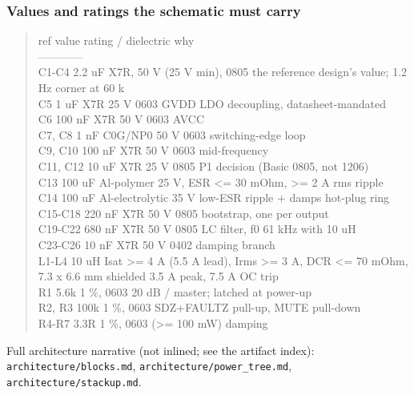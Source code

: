 \documentclass[11pt,a4paper]{article}
\begin{document}
\subsubsection*{Values and ratings the schematic must carry}
\begin{quote}\small\ttfamily\raggedright
\textbar{} ref \textbar{} value \textbar{} rating / dielectric \textbar{} why \textbar{}\\
\textbar{}---\textbar{}---\textbar{}---\textbar{}---\textbar{}\\
\textbar{} C1-C4 \textbar{} 2.2 uF \textbar{} X7R, 50 V (25 V min), 0805 \textbar{} the reference design's value; 1.2 Hz corner at 60 k \textbar{}\\
\textbar{} C5 \textbar{} 1 uF \textbar{} X7R 25 V 0603 \textbar{} GVDD LDO decoupling, datasheet-mandated \textbar{}\\
\textbar{} C6 \textbar{} 100 nF \textbar{} X7R 50 V 0603 \textbar{} AVCC \textbar{}\\
\textbar{} C7, C8 \textbar{} 1 nF \textbar{} C0G/NP0 50 V 0603 \textbar{} switching-edge loop \textbar{}\\
\textbar{} C9, C10 \textbar{} 100 nF \textbar{} X7R 50 V 0603 \textbar{} mid-frequency \textbar{}\\
\textbar{} C11, C12 \textbar{} 10 uF \textbar{} X7R 25 V 0805 \textbar{} P1 decision (Basic 0805, not 1206) \textbar{}\\
\textbar{} C13 \textbar{} 100 uF \textbar{} Al-polymer 25 V, ESR \textless{}= 30 mOhm, \textgreater{}= 2 A rms \textbar{} ripple \textbar{}\\
\textbar{} C14 \textbar{} 100 uF \textbar{} Al-electrolytic 35 V low-ESR \textbar{} ripple + damps hot-plug ring \textbar{}\\
\textbar{} C15-C18 \textbar{} 220 nF \textbar{} X7R 50 V 0805 \textbar{} bootstrap, one per output \textbar{}\\
\textbar{} C19-C22 \textbar{} 680 nF \textbar{} X7R 50 V 0805 \textbar{} LC filter, f0 61 kHz with 10 uH \textbar{}\\
\textbar{} C23-C26 \textbar{} 10 nF \textbar{} X7R 50 V 0402 \textbar{} damping branch \textbar{}\\
\textbar{} L1-L4 \textbar{} 10 uH \textbar{} Isat \textgreater{}= 4 A (5.5 A lead), Irms \textgreater{}= 3 A, DCR \textless{}= 70 mOhm, 7.3 x 6.6 mm shielded \textbar{} 3.5 A peak, 7.5 A OC trip \textbar{}\\
\textbar{} R1 \textbar{} 5.6k \textbar{} 1 \%, 0603 \textbar{} 20 dB / master; latched at power-up \textbar{}\\
\textbar{} R2, R3 \textbar{} 100k \textbar{} 1 \%, 0603 \textbar{} SDZ+FAULTZ pull-up, MUTE pull-down \textbar{}\\
\textbar{} R4-R7 \textbar{} 3.3R \textbar{} 1 \%, 0603 (\textgreater{}= 100 mW) \textbar{} damping \textbar{}
\end{quote}
Full architecture narrative (not inlined; see the artifact index): \texttt{architecture/blocks.md}, \texttt{architecture/power\_tree.md}, \texttt{architecture/stackup.md}.
\end{document}
